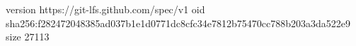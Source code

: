version https://git-lfs.github.com/spec/v1
oid sha256:f282472048385ad037b1e1d0771dc8cfc34e7812b75470cc788b203a3da522e9
size 27113
